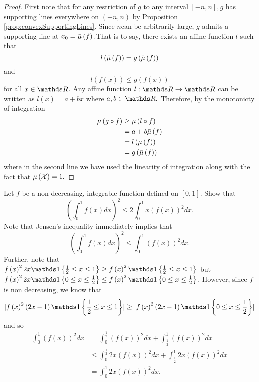 \begin{proof}
First note that for any restriction of $g$ to any interval $\left[-n,n\right],$$g$
has supporting lines everywhere on $\left(-n,n\right)$ by Proposition
\ref{prop:convexSupportingLines}. Since $n$can be arbitrarily large,
$g$ admits a supporting line at $x_{0}=\bar{\mu}\left(f\right).$That is to
say, there exists an affine function $l$ such that 
\[
l\left(\bar{\mu}\left(f\right)\right)=g\left(\bar{\mu}\left(f\right)\right)
\]
and
\[
l\left(f\left(x\right)\right)\leq g\left(f\left(x\right)\right)
\]
for all $x\in\R$. Any affine function $l:\R\to\R$ can be written
as $l\left(x\right)=a+bx$ where $a,b\in\R.$ Therefore, by the monotonicty
of integration
\begin{align*}
\bar{\mu}\left(g\circ f\right) & \geq\bar{\mu}\left(l\circ f\right)\\
 & =a+b\bar{\mu}\left(f\right)\\
 & =l\left(\bar{\mu}\left(f\right)\right)\\
 & =g\left(\bar{\mu}\left(f\right)\right)
\end{align*}
where in the second line we have used the linearity of integration
along with the fact that $\mu\left(\mathcal{X}\right)=1.$
\end{proof}
\begin{example}
\label{exa:isi2005samplepsb4}Let $f$ be a non-decreasing, integrable
function defined on $[0,1]$. Show that 
\[
\left(\int_{0}^{1}f(x)dx\right)^{2}\leq2\int_{0}^{1}x(f(x))^{2}dx.
\]
Note that Jensen's inequality immediately implies that 
\[
\left(\int_{0}^{1}f(x)dx\right)^{2}\leq\int_{0}^{1}(f(x))^{2}dx.
\]
 Further, note that $f\left(x\right)^{2}2x\indicate\left\{ \frac{1}{2}\leq x\leq1\right\} \geq f\left(x\right)^{2}\indicate\left\{ \frac{1}{2}\leq x\leq1\right\} $
but $f\left(x\right)^{2}2x\indicate\left\{ 0\leq x\leq\frac{1}{2}\right\} \leq f\left(x\right)^{2}\indicate\left\{ 0\leq x\leq\frac{1}{2}\right\} $.
However, since $f$ is non decreasing, we know that 
\[
\lvert f\left(x\right)^{2}\left(2x-1\right)\indicate\left\{ \frac{1}{2}\leq x\leq1\right\} \rvert\geq\lvert f\left(x\right)^{2}\left(2x-1\right)\indicate\left\{ 0\leq x\leq\frac{1}{2}\right\} \rvert
\]
and so 
\begin{align*}
\int_{0}^{1}(f(x))^{2}dx & =\int_{0}^{\frac{1}{2}}\left(f\left(x\right)\right)^{2}dx+\int_{\frac{1}{2}}^{1}\left(f\left(x\right)\right)^{2}dx\\
 & \leq\int_{0}^{\frac{1}{2}}2x\left(f\left(x\right)\right)^{2}dx+\int_{\frac{1}{2}}^{1}2x\left(f\left(x\right)\right)^{2}dx\\
 & =\int_{0}^{1}2x\left(f\left(x\right)\right)^{2}dx.
\end{align*}
\end{example}


